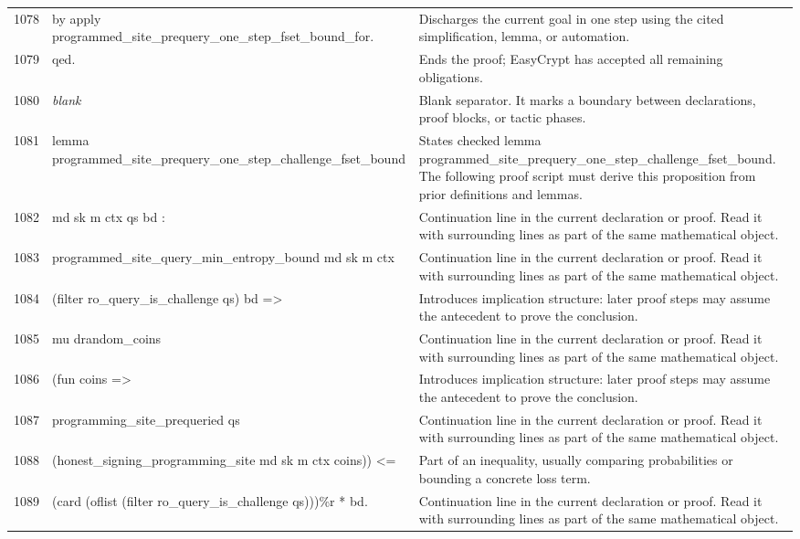 \documentclass[10pt]{article}
\begin{document}
\begin{longtable}{r L{0.53\textwidth} L{0.37\textwidth}}
1078 & {\ttfamily\scriptsize by apply programmed\_site\_prequery\_one\_step\_fset\_bound\_for.} & Discharges the current goal in one step using the cited simplification, lemma, or automation. \\
1079 & {\ttfamily\scriptsize qed.} & Ends the proof; EasyCrypt has accepted all remaining obligations. \\
1080 & {\ttfamily\scriptsize \emph{blank}} & Blank separator.  It marks a boundary between declarations, proof blocks, or tactic phases. \\
1081 & {\ttfamily\scriptsize lemma programmed\_site\_prequery\_one\_step\_challenge\_fset\_bound} & States checked lemma programmed\_site\_prequery\_one\_step\_challenge\_fset\_bound.  The following proof script must derive this proposition from prior definitions and lemmas. \\
1082 & {\ttfamily\scriptsize   md sk m ctx qs bd :} & Continuation line in the current declaration or proof.  Read it with surrounding lines as part of the same mathematical object. \\
1083 & {\ttfamily\scriptsize   programmed\_site\_query\_min\_entropy\_bound md sk m ctx} & Continuation line in the current declaration or proof.  Read it with surrounding lines as part of the same mathematical object. \\
1084 & {\ttfamily\scriptsize     (filter ro\_query\_is\_challenge qs) bd =>} & Introduces implication structure: later proof steps may assume the antecedent to prove the conclusion. \\
1085 & {\ttfamily\scriptsize   mu drandom\_coins} & Continuation line in the current declaration or proof.  Read it with surrounding lines as part of the same mathematical object. \\
1086 & {\ttfamily\scriptsize     (fun coins =>} & Introduces implication structure: later proof steps may assume the antecedent to prove the conclusion. \\
1087 & {\ttfamily\scriptsize       programming\_site\_prequeried qs} & Continuation line in the current declaration or proof.  Read it with surrounding lines as part of the same mathematical object. \\
1088 & {\ttfamily\scriptsize         (honest\_signing\_programming\_site md sk m ctx coins)) <=} & Part of an inequality, usually comparing probabilities or bounding a concrete loss term. \\
1089 & {\ttfamily\scriptsize   (card (oflist (filter ro\_query\_is\_challenge qs)))\%r * bd.} & Continuation line in the current declaration or proof.  Read it with surrounding lines as part of the same mathematical object. \\

\end{longtable}
\end{document}
